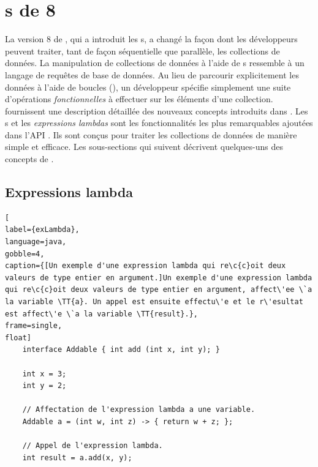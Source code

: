 \section{s de  8}
\label{java8.sect}

La version 8 de , qui a introduit les s, a chang\'e la façon dont les d\'eveloppeurs peuvent traiter, tant de fa\c{c}on s\'equentielle que parall\`ele, les collections de donn\'ees. La manipulation de collections de donn\'ees \`a l'aide de s ressemble \`a un langage de requ\^etes de base de donn\'ees. Au lieu de parcourir explicitement les donn\'ees \`a l'aide de boucles (), un d\'eveloppeur sp\'ecifie simplement une suite d'op\'erations \emph{fonctionnelles} \`a effectuer sur les \'el\'ements d'une collection. \cite{urma2014java} fournissent une description d\'etaill\'ee des nouveaux concepts introduits dans . Les s et les \emph{expressions lambdas} sont les fonctionnalit\'es les plus remarquables ajout\'ees dans l'API \citep{javaStreamAPI}. Ils sont con\c{c}us pour traiter les collections de donn\'ees de mani\`ere simple et efficace. Les sous-sections qui suivent d\'ecrivent quelques-uns des concepts de .


\subsection{Expressions lambda}




\begin{lstlisting}[
label={exLambda},
language=java,
gobble=4,
caption={[Un exemple d'une expression lambda qui re\c{c}oit deux valeurs de type entier en argument.]Un exemple d'une expression lambda qui re\c{c}oit deux valeurs de type entier en argument, affect\'ee \`a la variable \TT{a}. Un appel est ensuite effectu\'e et le r\'esultat est affect\'e \`a la variable \TT{result}.},
frame=single,
float]
    interface Addable { int add (int x, int y); }
    
    int x = 3;
    int y = 2;
    
    // Affectation de l'expression lambda a une variable.
    Addable a = (int w, int z) -> { return w + z; };

    // Appel de l'expression lambda.
    int result = a.add(x, y);    
\end{lstlisting}



